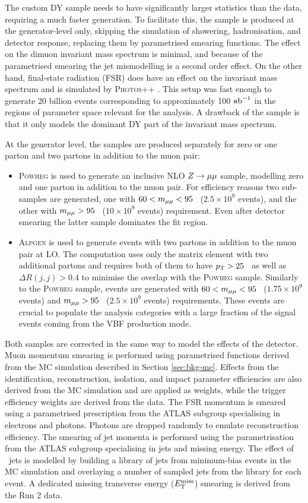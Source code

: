 The custom DY sample needs to have significantly larger statistics
than the data, requiring a much faster generation. To facilitate
this, the sample is produced at the generator-level only, skipping
the simulation of showering, hadronisation, and detector response,
replacing them by parametrised smearing functions. The effect on
the dimuon invariant mass spectrum is minimal, and because of the
parametrised smearing the jet mismodelling is a second order effect.
On the other hand, final-state radiation (FSR) does have an effect on
the invariant mass spectrum and is simulated by \textsc{Photos++}
\cite{Golonka:2006tw}. This setup was fast enough to generate 20
billion events corresponding to approximately 100 $\text{ab}^{-1}$ in the 
regions of parameter space relevant for the analysis. A drawback of
the sample is that it only models the dominant DY part of the
invariant mass spectrum.

At the generator level, the samples are produced separately for zero
or one parton and two partons in addition to the muon pair:
\begin{itemize}
\item \textsc{Powheg} is used to generate an inclusive NLO $Z \rightarrow \mu\mu$
sample, modelling zero and one parton in addition to the muon pair.
For efficiency reasons two sub-samples are generated, one with
$60 < m_{\mu\mu} < 95$ \GeV~($2.5\times10^{9}$ events), and the other
with $m_{\mu\mu} > 95$ \GeV~($10\times10^{9}$ events) requirement. Even
after detector smearing the latter sample dominates the fit region.
\item \textsc{Alpgen} \cite{Mangano:2002ea} is used to generate
events with two partons in addition to the muon pair at LO. The 
computation uses only the matrix element with two additional
partons and requires both of them to have $p_{\text{T}} > 25$ \GeV~as well
as $\Delta R(j,j) > 0.4$ to minimise the overlap with the
\textsc{Powheg} sample. Similarly to the \textsc{Powheg} sample,
events are generated with $60 < m_{\mu\mu} < 95$ \GeV~($1.75\times10^{9}$
events) and $m_{\mu\mu} > 95$ \GeV~($2.5\times10^{9}$ events)
requirements. These events are crucial to populate the analysis
categories with a large fraction of the signal events coming from
the VBF production mode.
\end{itemize}
Both samples are corrected in the same way to model the effects of
the detector. Muon momentum smearing is performed using parametrised functions
derived from the MC simulation described in Section \ref{sec:bkg-mc}.
Effects from the identification, reconstruction, isolation, and impact
parameter efficiencies are also derived from the MC simulation and 
are applied as weights, while the trigger efficiency weights are derived
from the data. The FSR momentum is smeared using a parametrised prescription
from the ATLAS subgroup specialising in electrons and photons.
Photons are dropped randomly to emulate reconstruction
efficiency. The smearing of jet momenta is performed using the parametrisation
from the ATLAS subgroup specialising in jets and missing energy.
The effect of \pileup~jets is modelled by building a library of
jets from minimum-bias events in the MC simulation and overlaying a
number of sampled jets from the library for each event. A dedicated
missing transverse energy ($E_\text{T}^\text{miss}$) smearing is derived from the Run 2 data.

